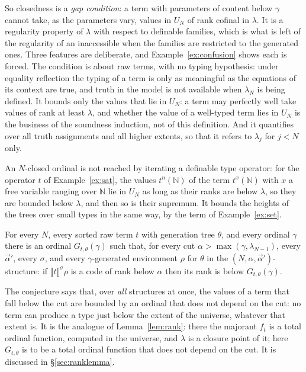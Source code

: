 \documentclass[10pt]{article}
\newcommand{\N}{\mathbb{N}}
\newcommand{\sem}[1]{\llbracket #1\rrbracket}
\begin{document}
So closedness is a \emph{gap condition}: a term with parameters of
content below $\gamma$ cannot take, as the parameters vary, values in
$U_N$ of rank cofinal in $\lambda$. It is a regularity property of
$\lambda$ with respect to definable families, which is what is left of
the regularity of an inaccessible when the families are restricted to
the generated ones. Three features are deliberate, and
Example~\ref{ex:confusion} shows each is forced. The condition is about
raw terms, with no typing hypothesis: under equality reflection the
typing of a term is only as meaningful as the equations of its context
are true, and truth in the model is not available when $\lambda_N$ is
being defined. It bounds only the values that lie in $U_N$: a term may
perfectly well take values of rank at least $\lambda$, and whether the
value of a well-typed term lies in $U_N$ is the business of the
soundness induction, not of this definition. And it quantifies over all
truth assignments and all higher extents, so that it refers to
$\lambda_j$ for $j<N$ only.

An $N$-closed ordinal is not reached by iterating a definable type
operator: for the operator $t$ of Example~\ref{ex:sat}, the values
$t^n(\N)$ of the term $t^x(\N)$ with $x$ a free variable ranging over
$\N$ lie in $U_N$ as long as their ranks are below $\lambda$, so they are
bounded below $\lambda$, and then so is their supremum. It bounds the
heights of the trees over small types in the same way, by the term of
Example~\ref{ex:set}.

\begin{conjecture}\label{conj:rank}
For every $N$, every sorted raw term $t$ with generation tree $\theta$,
and every ordinal $\gamma$ there is an ordinal $G_{t,\theta}(\gamma)$
such that, for every cut $\alpha>\max(\gamma,\lambda_{N-1})$, every
$\vec\alpha'$, every $\sigma$, and every $\gamma$-generated environment
$\rho$ for $\theta$ in the $(N,\alpha,\vec\alpha')$-structure: if
$\sem t^\sigma\rho$ is a code of rank below $\alpha$ then its rank is below
$G_{t,\theta}(\gamma)$.
\end{conjecture}

The conjecture says that, over \emph{all} structures at once, the values
of a term that fall below the cut are bounded by an ordinal that does
not depend on the cut: no term can produce a type just below the extent
of the universe, whatever that extent is. It is the analogue of
Lemma~\ref{lem:rank}: there the majorant $f_t$ is a total ordinal
function, computed in the universe, and $\lambda$ is a closure point of
it; here $G_{t,\theta}$ is to be a total ordinal function that does not
depend on the cut. It is discussed in \S\ref{sec:ranklemma}.
\end{document}

